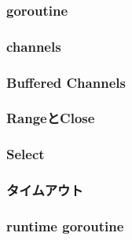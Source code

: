 
\subsubsection{goroutine}

\subsubsection{channels}

\subsubsection{Buffered Channels}

\subsubsection{RangeとClose}

\subsubsection{Select}

\subsubsection{タイムアウト}

\subsubsection{runtime goroutine}

